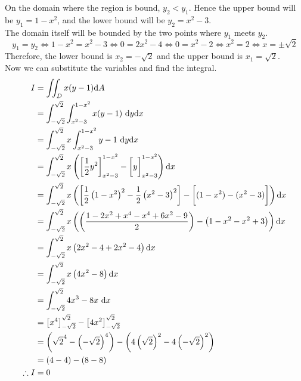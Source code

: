 \documentclass[a4paper,12pt]{report}
\begin{document}
On the domain where the region is bound, $y_2 < y_1$. Hence the upper bound will be $y_1 = 1 - x^2$, and the lower bound will be $y_2 = x^2- 3$. \\
The domain itself will be bounded by the two points where $y_1$ meets $y_2$.
$$
  y_1 = y_2 \iff 1 - x^2 = x^2 - 3 \iff 0 = 2x^2 - 4 \iff 0 = x^2 - 2 \iff x^2 = 2 \iff x = \pm\sqrt{2}
$$
Therefore, the lower bound is $x_2 = -\sqrt{2}$ and the upper bound is $x_1 = \sqrt{2}$. \\
Now we can substitute the variables and find the integral.
\begin{align*}
  I &= \iint_D x(y-1) \d A \\
    &= \int_{-\sqrt{2}}^{\sqrt{2}}\int_{x^2 - 3}^{1 - x^2} x(y-1)\ \d y\d x \\
    &= \int_{-\sqrt{2}}^{\sqrt{2}} x \int_{x^2 - 3}^{1 - x^2} y-1\ \d y\d x \\
    &= \int_{-\sqrt{2}}^{\sqrt{2}} x \bracks{\sqbracks{\frac{1}{2}y^2}_{x^2 - 3}^{1 - x^2} - \sqbracks{\vphantom{\frac{1}{2}}y}_{x^2 - 3}^{1 - x^2}} \d x \\
    &= \int_{-\sqrt{2}}^{\sqrt{2}} x \bracks{\sqbracks{\frac{1}{2}\bracks{{1 - x^2}}^2 - \frac{1}{2}\bracks{x^2 - 3}^2} - \sqbracks{\vphantom{\frac{1}{2}}(1 - x^2) - (x^2 - 3)}} \d x \\
    &= \int_{-\sqrt{2}}^{\sqrt{2}} x \bracks{\bracks{\frac{1 - 2x^2 + x^4 - x^4 + 6x^2 - 9}{2}} - \bracks{1 - x^2 - x^2 + 3}} \d x \\
    &= \int_{-\sqrt{2}}^{\sqrt{2}} x \bracks{2x^2 - 4 + 2x^2 - 4} \d x \\
    &= \int_{-\sqrt{2}}^{\sqrt{2}} x \bracks{4x^2 - 8} \d x \\
    &= \int_{-\sqrt{2}}^{\sqrt{2}} 4x^3 - 8x\ \d x \\
    &= \sqbracks{x^4}_{-\sqrt{2}}^{\sqrt{2}} - \sqbracks{4x^2}_{-\sqrt{2}}^{\sqrt{2}} \\
    &= \bracks{\sqrt{2}^4 - \bracks{-\sqrt{2}}^4} - \bracks{4\bracks{\sqrt{2}}^2 - 4\bracks{-\sqrt{2}}^2} \\
    &= \bracks{4 - 4} - \bracks{8 - 8} \\
  \tf I &= 0
\end{align*}
\end{document}
